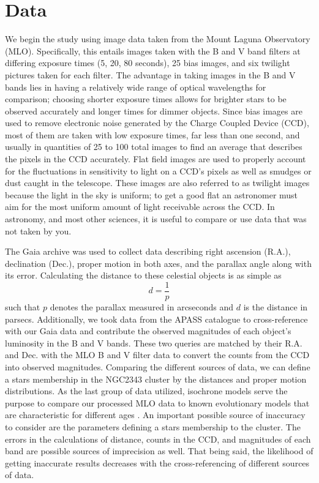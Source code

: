 \documentclass[linenumbers]{aastex631}
\begin{document}
\section{Data}\label{data}
We begin the study using image data taken from the Mount Laguna Observatory (MLO). Specifically, this entails images taken with the B and V band filters at differing exposure times (5, 20, 80 seconds), 25 bias images, and six twilight pictures taken for each filter. The advantage in taking images in the B and V bands lies in having a relatively wide range of optical wavelengths for comparison; choosing shorter exposure times allows for brighter stars to be observed accurately and longer times for dimmer objects. Since bias images are used to remove electronic noise generated by the Charge Coupled Device (CCD), most of them are taken with low exposure times, far less than one second, and usually in quantities of 25 to 100 total images to find an average that describes the pixels in the CCD accurately. Flat field images are used to properly account for the fluctuations in sensitivity to light on a CCD's pixels as well as smudges or dust caught in the telescope. These images are also referred to as twilight images because the light in the sky is uniform; to get a good flat an astronomer must aim for the most uniform amount of light receivable across the CCD. In astronomy, and most other sciences, it is useful to compare or use data that was not taken by you.

The Gaia archive was used to collect data describing right ascension (R.A.), declination (Dec.), proper motion in both axes, and the parallax angle along with its error. Calculating the distance to these celestial objects is as simple as $$d = \frac{1}{p}$$ such that $p$ denotes the parallax measured in arcseconds and $d$ is the distance in parsecs. Additionally, we took data from the APASS catalogue to cross-reference with our Gaia data and contribute the observed magnitudes of each object's luminosity in the B and V bands. These two queries are matched by their R.A. and Dec. with the MLO B and V filter data to convert the counts from the CCD into observed magnitudes. Comparing the different sources of data, we can define a stars membership in the NGC2343 cluster by the distances and proper motion distributions. As the last group of data utilized, isochrone models serve the purpose to compare our processed MLO data to known evolutionary models that are characteristic for different ages \citep{2012MNRAS.427..127B}. An important possible source of inaccuracy to consider are the parameters defining a stars membership to the cluster. The errors in the calculations of distance, counts in the CCD, and magnitudes of each band are possible sources of imprecision as well. That being said, the likelihood of getting inaccurate results decreases with the cross-referencing of different sources of data.
\end{document}

